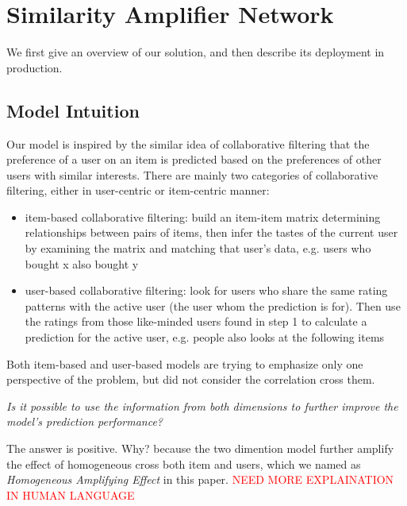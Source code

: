 \section{Similarity Amplifier Network }
\label{sec:model}

We first give an overview of our solution, and then describe its
deployment in production.

\subsection{Model Intuition} 
\label{sec:model_intuition}

Our model is inspired by the similar idea of collaborative filtering
that the preference of a user on an item is predicted based on the
preferences of other users with similar interests.  There are mainly
two categories of collaborative filtering, either in user-centric or
item-centric manner:
\begin{itemize}
\item item-based collaborative filtering: build an item-item matrix
  determining relationships between pairs of items, then infer the
  tastes of the current user by examining the matrix and matching that
  user's data, e.g. users who bought x also bought y
\item user-based collaborative filtering: look for users who share the
  same rating patterns with the active user (the user whom the
  prediction is for). Then use the ratings from those like-minded
  users found in step 1 to calculate a prediction for the active user,
  e.g. people also looks at the following items
\end{itemize}
Both item-based and user-based models are trying to emphasize only one
perspective of the problem, but did not consider the correlation cross
them.

\textit{ Is it possible to use the information from both dimensions to
  further improve the model's prediction performance? }

The answer is positive. Why?  because the two dimention model further
amplify the effect of homogeneous cross both item and users, which we
named as {\it Homogeneous Amplifying Effect} in this
paper. \textcolor{red}{NEED MORE EXPLAINATION IN HUMAN LANGUAGE}

